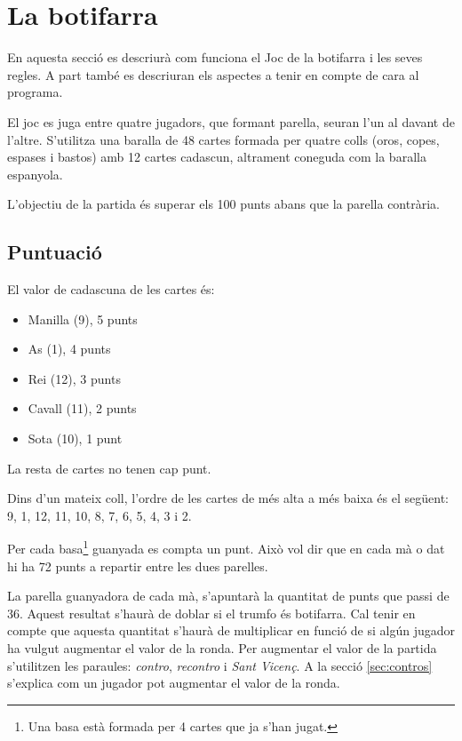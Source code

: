 \chapter{La botifarra}
\label{chap:botifarra}

En aquesta secció es descriurà com funciona el Joc de la botifarra i les seves regles. A part també es descriuran els aspectes a tenir en compte de cara al programa. 


El joc es juga entre quatre jugadors, que formant parella, seuran l'un al davant de l'altre. S'utilitza una baralla de 48 cartes formada per quatre colls (oros, copes, espases i bastos) amb 12 cartes cadascun, altrament coneguda com la baralla espanyola.


L'objectiu de la partida és superar els 100 punts abans que la parella contrària. 


\section{Puntuació}

El valor de cadascuna de les cartes és:
\begin{itemize}
	\item{Manilla (9), 5 punts}
    \item{As (1), 4 punts}
    \item{Rei (12), 3 punts}
    \item{Cavall (11), 2 punts}
    \item{Sota (10), 1 punt}
\end{itemize}

La resta de cartes no tenen cap punt.
    
Dins d'un mateix coll, l'ordre de les cartes de més alta a més baixa és el següent: 9, 1, 12, 11, 10, 8, 7, 6, 5, 4, 3 i 2.

Per cada basa\footnote{Una basa està formada per 4 cartes que ja s'han jugat.} guanyada es compta un punt. Això vol dir que en cada mà o dat hi ha 72 punts a repartir entre les dues parelles.

La parella guanyadora de cada mà, s'apuntarà la quantitat de punts que passi de 36. Aquest resultat s'haurà de doblar si el trumfo és botifarra. Cal tenir en compte que aquesta quantitat s'haurà de multiplicar en funció de si algún jugador ha vulgut augmentar el valor de la ronda. Per augmentar el valor de la partida s'utilitzen les paraules: \emph{contro}, \emph{recontro} i \emph{Sant Vicenç}. A la secció \ref{sec:contros} s'explica com un jugador pot augmentar el valor de la ronda.

